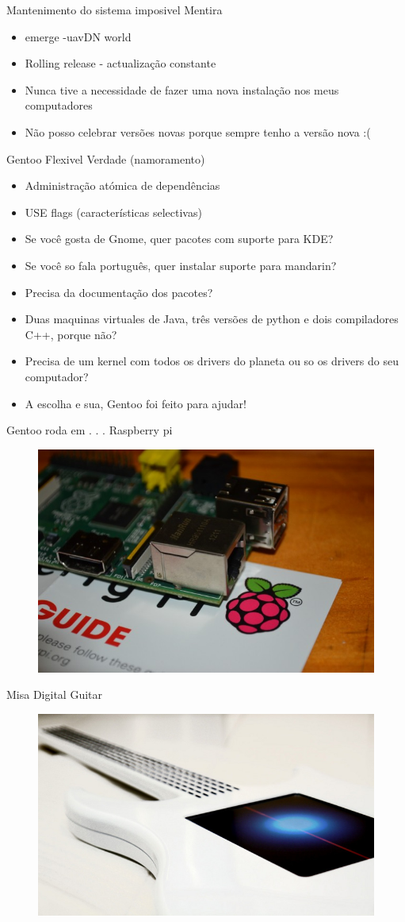 \documentclass{beamer}
\begin{document}
\begin{frame}{Mantenimento do sistema imposivel}
Mentira
\begin{itemize}
\item emerge -uavDN world
\item Rolling release - actualização constante
\item Nunca tive a necessidade de fazer uma nova instalação nos meus computadores 
\item Não posso celebrar versões novas porque sempre tenho a versão nova :(
\end{itemize}
\end{frame}

\begin{frame}{Gentoo Flexivel}
Verdade (namoramento)
\begin{itemize}
\item Administração atómica de dependências
\item USE flags (características selectivas)
\item Se você gosta de Gnome, quer pacotes com suporte para KDE?
\item Se você so fala português, quer instalar suporte para mandarin?
\item Precisa da documentação dos pacotes?
\item Duas maquinas virtuales de Java, três versões de python e dois compiladores C++, porque não?
\item Precisa de um kernel com todos os drivers do planeta ou so os drivers do seu computador?
\item A escolha e sua, Gentoo foi feito para ajudar!
\end{itemize}
\end{frame}


\begin{frame}{Gentoo roda em . . .}
Raspberry pi \cite{RPi2012}
\begin{figure}[tbph]
\centering
\includegraphics[width=0.4\linewidth]{./rasp}
\label{fig:rasp}
\end{figure}
Misa Digital Guitar \cite{Js2012}
\begin{figure}[tbph]
\centering
\includegraphics[width=0.4\linewidth]{./misa}
\label{fig:misa}
\end{figure}

\end{frame}
\end{document}
